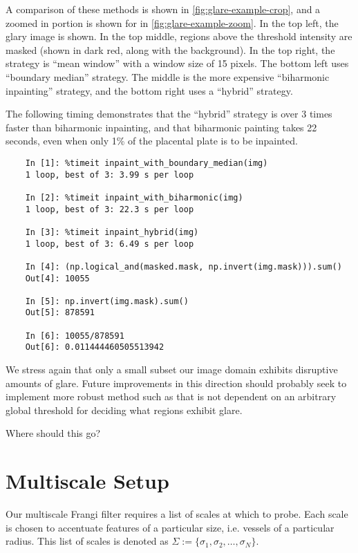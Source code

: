 	A comparison of these methods is shown in \cref{fig:glare-example-crop}, and a zoomed in portion is shown
	for in \cref{fig:glare-example-zoom}. In the top left, the glary image is shown.  In the top middle,
	regions above the threshold intensity are masked (shown in dark red, along with the background). In the top right, the strategy is ``mean window'' with a window size of 15 pixels. The bottom left uses ``boundary median'' strategy. The middle is the more expensive ``biharmonic inpainting'' strategy, and the bottom right uses a ``hybrid'' strategy.
	
	The following timing demonstrates that the ``hybrid'' strategy is over 3 times faster than biharmonic inpainting, and that biharmonic painting takes 22 seconds, even when only 1\% of the placental plate is to be inpainted.
	
	\begin{lstlisting}
	In [1]: %timeit inpaint_with_boundary_median(img)
	1 loop, best of 3: 3.99 s per loop
	
	In [2]: %timeit inpaint_with_biharmonic(img)
	1 loop, best of 3: 22.3 s per loop
	
	In [3]: %timeit inpaint_hybrid(img)
	1 loop, best of 3: 6.49 s per loop
	
	In [4]: (np.logical_and(masked.mask, np.invert(img.mask))).sum()
	Out[4]: 10055
	
	In [5]: np.invert(img.mask).sum()
	Out[5]: 878591
	
	In [6]: 10055/878591
	Out[6]: 0.011444460505513942
	\end{lstlisting}

	
	We stress again that only a small subset our image domain exhibits disruptive amounts of glare.
	Future improvements in this direction should probably seek to implement more robust method such as
	\cite{lange2005glare} that is not dependent on an arbitrary global threshold for deciding what regions
	exhibit glare.
	

	
	Where should this go?
	
\section{Multiscale Setup}

	Our multiscale Frangi filter requires a list of scales at which to probe. Each scale is chosen to accentuate features of a particular size, i.e. vessels of a particular radius. This  list of scales is denoted as $\Sigma := \{ \sigma_1, \sigma_2, \dots, \sigma_N\}$. 
	 
